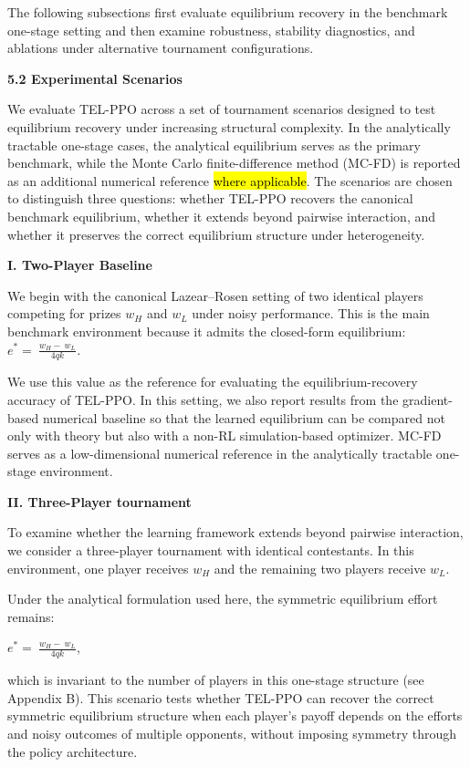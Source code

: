 \documentclass[
]{article}
\begin{document}
The following subsections first evaluate equilibrium recovery in the
benchmark one-stage setting and then examine robustness, stability
diagnostics, and ablations under alternative tournament configurations.

\textbf{5.2 Experimental Scenarios}

We evaluate TEL-PPO across a set of tournament scenarios designed to
test equilibrium recovery under increasing structural complexity. In the
analytically tractable one-stage cases, the analytical equilibrium
serves as the primary benchmark, while the Monte Carlo finite-difference
method (MC-FD) is reported as an additional numerical reference
\hl{where applicable}. The scenarios are chosen to distinguish three
questions: whether TEL-PPO recovers the canonical benchmark equilibrium,
whether it extends beyond pairwise interaction, and whether it preserves
the correct equilibrium structure under heterogeneity.

\textbf{I. Two-Player Baseline}

We begin with the canonical Lazear--Rosen setting of two identical
players competing for prizes \(w_{H}\) and \(w_{L}\) under noisy
performance. This is the main benchmark environment because it admits
the closed-form equilibrium:
\(e^{*} = \ \frac{w_{H} - \ w_{L}}{4qk}\)\emph{.}

We use this value as the reference for evaluating the
equilibrium-recovery accuracy of TEL-PPO. In this setting, we also
report results from the gradient-based numerical baseline so that the
learned equilibrium can be compared not only with theory but also with a
non-RL simulation-based optimizer. MC-FD serves as a low-dimensional
numerical reference in the analytically tractable one-stage environment.

\textbf{II. Three-Player tournament}

To examine whether the learning framework extends beyond pairwise
interaction, we consider a three-player tournament with identical
contestants. In this environment, one player receives \(w_{H}\) and the
remaining two players receive \(w_{L}\).

Under the analytical formulation used here, the symmetric equilibrium
effort remains:

\(e^{*} = \ \frac{w_{H} - \ w_{L}}{4qk}\),

which is invariant to the number of players in this one-stage structure
(see Appendix B). This scenario tests whether TEL-PPO can recover the
correct symmetric equilibrium structure when each player's payoff
depends on the efforts and noisy outcomes of multiple opponents, without
imposing symmetry through the policy architecture.
\end{document}
